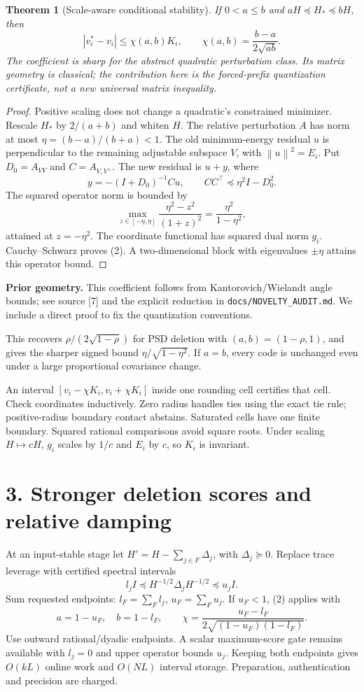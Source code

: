 \documentclass[11pt]{article}
\newtheorem{theorem}{Theorem}\newtheorem{lemma}{Lemma}\newtheorem{corollary}{Corollary}
\newcommand{\norm}[1]{\left\|#1\right\|}\newcommand{\tr}{\operatorname{tr}}
\begin{document}
\begin{theorem}[Scale-aware conditional stability]
If $0<a\leq b$ and $aH\preceq H_*\preceq bH$, then
\[
 \boxed{|v_i^*-v_i|\leq\chi(a,b)K_i,\qquad
 \chi(a,b)=\frac{b-a}{2\sqrt{ab}}.} \tag{2}
\]
The coefficient is sharp for the abstract quadratic perturbation class. Its matrix geometry is classical; the contribution here is the forced-prefix quantization certificate, not a new universal matrix inequality.
\end{theorem}
\begin{proof}
Positive scaling does not change a quadratic's constrained minimizer. Rescale $H_*$ by $2/(a+b)$ and whiten $H$. The relative perturbation $A$ has norm at most $\eta=(b-a)/(b+a)<1$. The old minimum-energy residual $u$ is perpendicular to the remaining adjustable subspace $V$, with $\norm u^2=E_i$. Put $D_0=A_{VV}$ and $C=A_{V,V^\perp}$. The new residual is $u+y$, where
\[
 y=-(I+D_0)^{-1}Cu,\qquad CC^{\top}\preceq\eta^2I-D_0^2.
\]
The squared operator norm is bounded by
\[
 \max_{z\in[-\eta,\eta]}\frac{\eta^2-z^2}{(1+z)^2}
 =\frac{\eta^2}{1-\eta^2},
\]
attained at $z=-\eta^2$. The coordinate functional has squared dual norm $g_i$. Cauchy--Schwarz proves (2). A two-dimensional block with eigenvalues $\pm\eta$ attains this operator bound.
\end{proof}

\textbf{Prior geometry.} This coefficient follows from Kantorovich/Wielandt angle bounds; see source [7] and the explicit reduction in \texttt{docs/NOVELTY\_AUDIT.md}. We include a direct proof to fix the quantization conventions.

This recovers $\rho/(2\sqrt{1-\rho})$ for PSD deletion with $(a,b)=(1-\rho,1)$, and gives the sharper signed bound $\eta/\sqrt{1-\eta^2}$. If $a=b$, every code is unchanged even under a large proportional covariance change.

An interval $[v_i-\chi K_i,v_i+\chi K_i]$ inside one rounding cell certifies that cell. Check coordinates inductively. Zero radius handles ties using the exact tie rule; positive-radius boundary contact abstains. Saturated cells have one finite boundary. Squared rational comparisons avoid square roots. Under scaling $H\mapsto cH$, $g_i$ scales by $1/c$ and $E_i$ by $c$, so $K_i$ is invariant.

\newpage
\section*{3. Stronger deletion scores and relative damping}
At an input-stable stage let $H'=H-\sum_{j\in F}\Delta_j$, with $\Delta_j\succeq0$. Replace trace leverage with certified spectral intervals
\[
 l_j I\preceq H^{-1/2}\Delta_jH^{-1/2}\preceq u_j I.
\]
Sum requested endpoints: $l_F=\sum_F l_j$, $u_F=\sum_Fu_j$. If $u_F<1$, (2) applies with
\[
 a=1-u_F,\quad b=1-l_F,\qquad
 \chi=\frac{u_F-l_F}{2\sqrt{(1-u_F)(1-l_F)}}. \tag{3}
\]
Use outward rational/dyadic endpoints. A scalar maximum-score gate remains available with $l_j=0$ and upper operator bounds $u_j$. Keeping both endpoints gives $O(kL)$ online work and $O(NL)$ interval storage. Preparation, authentication and precision are charged.
\end{document}
